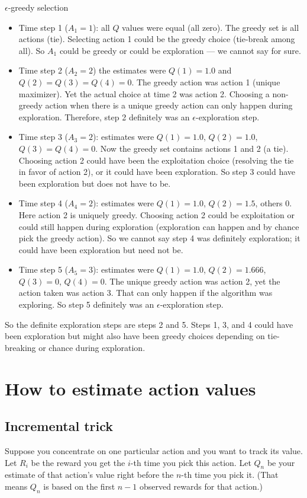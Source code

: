 \begin{Exercise}{$\epsilon$-greedy selection}{}
\begin{itemize}
    \item Time step 1 ($A_1 = 1$): all $Q$ values were equal (all zero). The greedy set is all actions (tie). Selecting action 1 could be the greedy choice (tie-break among all). So $A_1$ could be greedy or could be exploration — we cannot say for sure.
    \item Time step 2 ($A_2 = 2$) the estimates were $Q(1)=1.0$ and $Q(2)=Q(3)=Q(4)=0$. The greedy action was action 1 (unique maximizer). Yet the actual choice at time 2 was action 2. Choosing a non-greedy action when there is a unique greedy action can only happen during exploration. Therefore, step 2 definitely was an $\epsilon$-exploration step.
    \item Time step 3 ($A_3 = 2$): estimates were $Q(1)=1.0$, $Q(2)=1.0$, $Q(3)=Q(4)=0$. Now the greedy set contains actions 1 and 2 (a tie). Choosing action 2 could have been the exploitation choice (resolving the tie in favor of action 2), or it could have been exploration. So step 3 could have been exploration but does not have to be.
    \item Time step 4 ($A_4 = 2$): estimates were $Q(1)=1.0$, $Q(2)=1.5$, others 0. Here action 2 is uniquely greedy. Choosing action 2 could be exploitation or could still happen during exploration (exploration can happen and by chance pick the greedy action). So we cannot say step 4 was definitely exploration; it could have been exploration but need not be.
    \item Time step 5 ($A_5 = 3$): estimates were $Q(1)=1.0$, $Q(2)=1.666$, $Q(3)=0$, $Q(4)=0$. The unique greedy action was action 2, yet the action taken was action 3. That can only happen if the algorithm was exploring. So step 5 definitely was an $\epsilon$-exploration step.
\end{itemize}

So the definite exploration steps are steps 2 and 5. Steps 1, 3, and 4 could have been exploration but might also have been greedy choices depending on tie-breaking or chance during exploration.
\end{Exercise}

\section{How to estimate action values}
\subsection{Incremental trick}
Suppose you concentrate on one particular action and you want to track its value. Let $R_i$ be the reward you get the $i$-th time you pick this action. Let $Q_n$ be your estimate of that action’s value right before the $n$-th time you pick it. (That means $Q_n$ is based on the first $n-1$ observed rewards for that action.)

